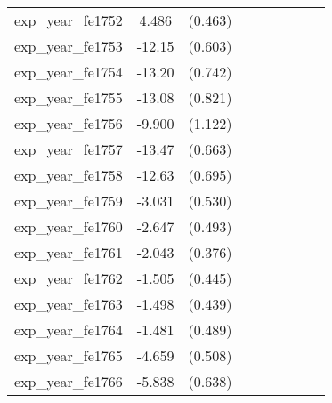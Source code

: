 {\begin{tabular}{l*{4}{cc}}
exp\_year\_fe1752&    4.486\sym{***}&  (0.463)&                  &         &                  &         &                  &         \\
exp\_year\_fe1753&   -12.15\sym{***}&  (0.603)&                  &         &                  &         &                  &         \\
exp\_year\_fe1754&   -13.20\sym{***}&  (0.742)&                  &         &                  &         &                  &         \\
exp\_year\_fe1755&   -13.08\sym{***}&  (0.821)&                  &         &                  &         &                  &         \\
exp\_year\_fe1756&   -9.900\sym{***}&  (1.122)&                  &         &                  &         &                  &         \\
exp\_year\_fe1757&   -13.47\sym{***}&  (0.663)&                  &         &                  &         &                  &         \\
exp\_year\_fe1758&   -12.63\sym{***}&  (0.695)&                  &         &                  &         &                  &         \\
exp\_year\_fe1759&   -3.031\sym{***}&  (0.530)&                  &         &                  &         &                  &         \\
exp\_year\_fe1760&   -2.647\sym{***}&  (0.493)&                  &         &                  &         &                  &         \\
exp\_year\_fe1761&   -2.043\sym{***}&  (0.376)&                  &         &                  &         &                  &         \\
exp\_year\_fe1762&   -1.505\sym{***}&  (0.445)&                  &         &                  &         &                  &         \\
exp\_year\_fe1763&   -1.498\sym{***}&  (0.439)&                  &         &                  &         &                  &         \\
exp\_year\_fe1764&   -1.481\sym{**} &  (0.489)&                  &         &                  &         &                  &         \\
exp\_year\_fe1765&   -4.659\sym{***}&  (0.508)&                  &         &                  &         &                  &         \\
exp\_year\_fe1766&   -5.838\sym{***}&  (0.638)&                  &         &                  &         &                  &         \\

\end{tabular}}
